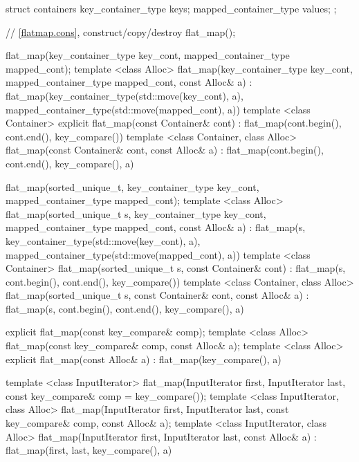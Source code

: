\begin{codeblock}
\begin{codeblock}
\begin{codeblock}
\begin{addedblock}
\begin{codeblock}
{{      struct containers
      {
        key_container_type keys;
        mapped_container_type values;
      };

      // \ref{flatmap.cons}, construct/copy/destroy
      flat_map();

      flat_map(key_container_type key_cont, mapped_container_type mapped_cont);
      template <class Alloc>
      flat_map(key_container_type key_cont, mapped_container_type mapped_cont,
               const Alloc& a)
          : flat_map(key_container_type(std::move(key_cont), a),
                     mapped_container_type(std::move(mapped_cont), a))
        { }
      template <class Container>
        explicit flat_map(const Container& cont)
          : flat_map(cont.begin(), cont.end(), key_compare()) { }
      template <class Container, class Alloc>
        flat_map(const Container& cont, const Alloc& a)
          : flat_map(cont.begin(), cont.end(), key_compare(), a) { }

      flat_map(sorted_unique_t,
               key_container_type key_cont, mapped_container_type mapped_cont);
      template <class Alloc>
      flat_map(sorted_unique_t s, key_container_type key_cont,
               mapped_container_type mapped_cont, const Alloc& a)
          : flat_map(s, key_container_type(std::move(key_cont), a),
                     mapped_container_type(std::move(mapped_cont), a))
        { }
      template <class Container>
        flat_map(sorted_unique_t s, const Container& cont)
          : flat_map(s, cont.begin(), cont.end(), key_compare()) { }
      template <class Container, class Alloc>
        flat_map(sorted_unique_t s, const Container& cont, const Alloc& a)
          : flat_map(s, cont.begin(), cont.end(), key_compare(), a) { }

      explicit flat_map(const key_compare& comp);
      template <class Alloc>
        flat_map(const key_compare& comp, const Alloc& a);
      template <class Alloc>
        explicit flat_map(const Alloc& a)
          : flat_map(key_compare(), a) { }

      template <class InputIterator>
        flat_map(InputIterator first, InputIterator last,
                 const key_compare& comp = key_compare());
      template <class InputIterator, class Alloc>
        flat_map(InputIterator first, InputIterator last,
                 const key_compare& comp, const Alloc& a);
      template <class InputIterator, class Alloc>
        flat_map(InputIterator first, InputIterator last,
                 const Alloc& a)
          : flat_map(first, last, key_compare(), a) { }

}}
\end{codeblock}
\end{addedblock}
\end{codeblock}
\end{codeblock}
\end{codeblock}
